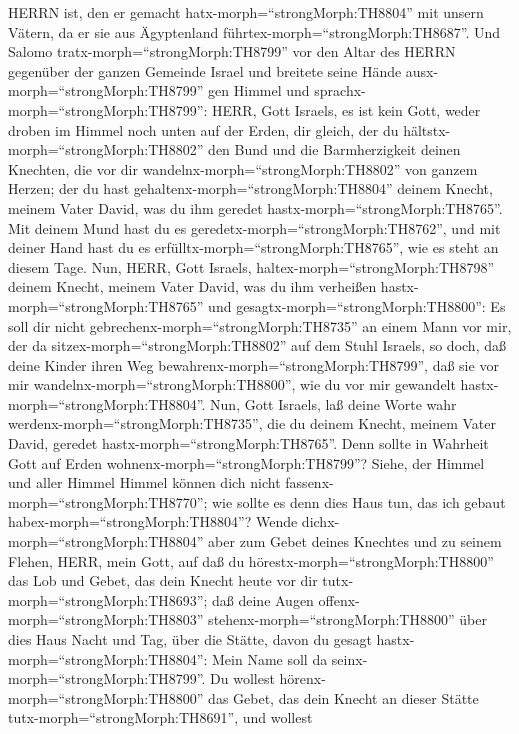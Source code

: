 HERRN ist, den er gemacht hatx-morph=``strongMorph:TH8804'' mit unsern
Vätern, da er sie aus Ägyptenland führtex-morph=``strongMorph:TH8687''.
 Und Salomo tratx-morph=``strongMorph:TH8799'' vor den
Altar des HERRN gegenüber der ganzen Gemeinde Israel und breitete seine
Hände ausx-morph=``strongMorph:TH8799'' gen Himmel  und
sprachx-morph=``strongMorph:TH8799'': HERR, Gott Israels, es ist kein
Gott, weder droben im Himmel noch unten auf der Erden, dir gleich, der
du hältstx-morph=``strongMorph:TH8802'' den Bund und die Barmherzigkeit
deinen Knechten, die vor dir wandelnx-morph=``strongMorph:TH8802'' von
ganzem Herzen;  der du hast
gehaltenx-morph=``strongMorph:TH8804'' deinem Knecht, meinem Vater
David, was du ihm geredet hastx-morph=``strongMorph:TH8765''. Mit deinem
Mund hast du es geredetx-morph=``strongMorph:TH8762'', und mit deiner
Hand hast du es erfülltx-morph=``strongMorph:TH8765'', wie es steht an
diesem Tage.  Nun, HERR, Gott Israels,
haltex-morph=``strongMorph:TH8798'' deinem Knecht, meinem Vater David,
was du ihm verheißen hastx-morph=``strongMorph:TH8765'' und
gesagtx-morph=``strongMorph:TH8800'': Es soll dir nicht
gebrechenx-morph=``strongMorph:TH8735'' an einem Mann vor mir, der da
sitzex-morph=``strongMorph:TH8802'' auf dem Stuhl Israels, so doch, daß
deine Kinder ihren Weg bewahrenx-morph=``strongMorph:TH8799'', daß sie
vor mir wandelnx-morph=``strongMorph:TH8800'', wie du vor mir gewandelt
hastx-morph=``strongMorph:TH8804''.  Nun, Gott Israels, laß
deine Worte wahr werdenx-morph=``strongMorph:TH8735'', die du deinem
Knecht, meinem Vater David, geredet hastx-morph=``strongMorph:TH8765''.
 Denn sollte in Wahrheit Gott auf Erden
wohnenx-morph=``strongMorph:TH8799''? Siehe, der Himmel und aller Himmel
Himmel können dich nicht fassenx-morph=``strongMorph:TH8770''; wie
sollte es denn dies Haus tun, das ich gebaut
habex-morph=``strongMorph:TH8804''?  Wende
dichx-morph=``strongMorph:TH8804'' aber zum Gebet deines Knechtes und zu
seinem Flehen, HERR, mein Gott, auf daß du
hörestx-morph=``strongMorph:TH8800'' das Lob und Gebet, das dein Knecht
heute vor dir tutx-morph=``strongMorph:TH8693'';  daß deine
Augen offenx-morph=``strongMorph:TH8803''
stehenx-morph=``strongMorph:TH8800'' über dies Haus Nacht und Tag, über
die Stätte, davon du gesagt hastx-morph=``strongMorph:TH8804'': Mein
Name soll da seinx-morph=``strongMorph:TH8799''. Du wollest
hörenx-morph=``strongMorph:TH8800'' das Gebet, das dein Knecht an dieser
Stätte tutx-morph=``strongMorph:TH8691'',  und wollest
